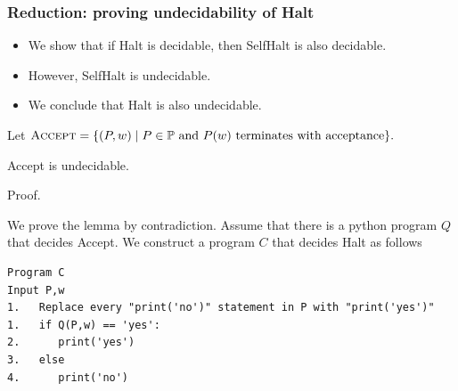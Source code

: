 
\begin{frame}
  \frametitle{Reduction: proving undecidability of {\sc Halt}}

  \begin{itemize}
  \item We show that if {\sc Halt} is decidable, then {\sc SelfHalt} is
    also decidable.
  \item However, {\sc SelfHalt is undecidable}.
  \item We conclude that {\sc Halt} is also undecidable.
  \end{itemize}
\end{frame}


\begin{frame}[fragile=true]
  
  {\small
    Let $\textsc{Accept} = \{(P,w) \;|\;
    \mbox{$P\in{\mathbb P}$ and $P(w)$ terminates with acceptance}\}.$
  }
  
  \begin{lemma}
    {\sc Accept} is undecidable.
  \end{lemma}
  \begin{block}{Proof.}

      We prove the lemma by contradiction.  Assume that there is a
      python program $Q$ that decides {\sc Accept}.  We
      construct a program $C$ that decides {\sc Halt} as follows 
      
      {\footnotesize
\begin{verbatim}
Program C       
Input P,w       
1.   Replace every "print('no')" statement in P with "print('yes')"
1.   if Q(P,w) == 'yes':
2.      print('yes')
3.   else
4.      print('no')
\end{verbatim}
      }

  \end{block}
\end{frame}

